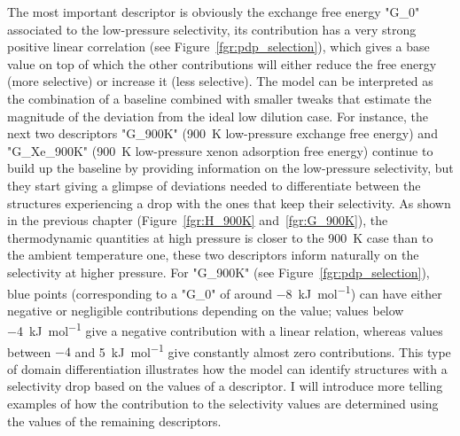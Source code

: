 \documentclass[main]{subfiles}
\begin{document}
The most important descriptor is obviously the exchange free energy "G\_0" associated to the low-pressure selectivity, its contribution has a very strong positive linear correlation (see Figure~\ref{fgr:pdp_selection}), which gives a base value on top of which the other contributions will either reduce the free energy (more selective) or increase it (less selective). The model can be interpreted as the combination of a baseline combined with smaller tweaks that estimate the magnitude of the deviation from the ideal low dilution case. For instance, the next two descriptors "G\_900K" (\SI{900}{\kelvin} low-pressure exchange free energy) and "G\_Xe\_900K" (\SI{900}{\kelvin} low-pressure xenon adsorption free energy) continue to build up the baseline by providing information on the low-pressure selectivity, but they start giving a glimpse of deviations needed to differentiate between the structures experiencing a drop with the ones that keep their selectivity. As shown in the previous chapter (Figure~\ref{fgr:H_900K} and~\ref{fgr:G_900K}), the thermodynamic quantities at high pressure is closer to the \SI{900}{\kelvin} case than to the ambient temperature one, these two descriptors inform naturally on the selectivity at higher pressure. For "G\_900K" (see Figure~\ref{fgr:pdp_selection}), blue points (corresponding to a "G\_0" of around \SI{-8}{\kilo\joule\per\mole}) can have either negative or negligible contributions depending on the value; values below \SI{-4}{\kilo\joule\per\mole} give a negative contribution with a linear relation, whereas values between $-4$ and \SI{5}{\kilo\joule\per\mole} give constantly almost zero contributions. This type of domain differentiation illustrates how the model can identify structures with a selectivity drop based on the values of a descriptor. I will introduce more telling examples of how the contribution to the selectivity values are determined using the values of the remaining descriptors.
\end{document}
